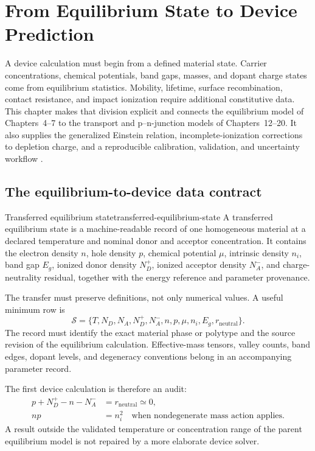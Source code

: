 \chapter{From Equilibrium State to Device Prediction}
\label{ch:equilibrium-to-device-prediction}

A device calculation must begin from a defined material state.  Carrier
concentrations, chemical potentials, band gaps, masses, and dopant charge states
come from equilibrium statistics.  Mobility, lifetime, surface recombination,
contact resistance, and impact ionization require additional constitutive data.
This chapter makes that division explicit and connects the equilibrium model of
Chapters~4--7 to the transport and p--n-junction models of
Chapters~12--20.  It also supplies the generalized Einstein relation,
incomplete-ionization corrections to depletion charge, and a reproducible
calibration, validation, and uncertainty workflow
\cite[Chaps.~2--3]{szeLee2012} \cite[Chaps.~1--2]{szeNg2007}.

\section{The equilibrium-to-device data contract}

\begin{definition}{Transferred equilibrium state}{transferred-equilibrium-state}
A transferred equilibrium state is a machine-readable record of one homogeneous
material at a declared temperature and nominal donor and acceptor concentration.
It contains the electron density $n$, hole density $p$, chemical potential
$\mu$, intrinsic density $n_i$, band gap $E_g$, ionized donor density $N_D^+$,
ionized acceptor density $N_A^-$, and charge-neutrality residual, together with
the energy reference and parameter provenance.
\end{definition}

The transfer must preserve definitions, not only numerical values.  A useful
minimum row is
\begin{equation}
 \mathcal S=
 \{T,N_D,N_A,N_D^+,N_A^-,n,p,\mu,n_i,E_g,r_{\mathrm{neutral}}\}.
 \label{eq:equilibrium-state-record}
\end{equation}
The record must identify the exact material phase or polytype and the source
revision of the equilibrium calculation.  Effective-mass tensors, valley
counts, band edges, dopant levels, and degeneracy conventions belong in an
accompanying parameter record.

The first device calculation is therefore an audit:
\begin{align}
 p+N_D^+-n-N_A^-&=r_{\mathrm{neutral}}\simeq0,
 \label{eq:transferred-neutrality-check}\\
 np&=n_i^2
 \quad\text{when nondegenerate mass action applies}.
 \label{eq:transferred-mass-action-check}
\end{align}
A result outside the validated temperature or concentration range of the
parent equilibrium model is not repaired by a more elaborate device solver.

